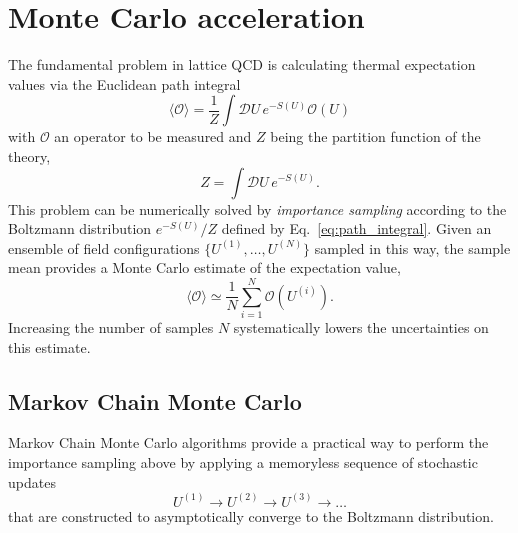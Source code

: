 \documentclass[12pt]{article}
\begin{document}
\section{Monte Carlo acceleration}\label{sec:mc-acceleration}

The fundamental problem in lattice QCD is calculating thermal expectation values via the Euclidean path integral
\begin{equation}
\label{eq:path_integral}
  \langle \mathcal{O} \rangle = \frac{1}{Z} \int \mathcal{D} U \, e^{-S(U)}  \mathcal{O}(U)
\end{equation}
with $\mathcal{O}$ an operator to be measured and $Z$ being the partition function of the theory,
\begin{equation}
\label{eq:partition_function}
  Z = \int \mathcal{D} U \, e^{-S(U)}.
\end{equation}
This problem can be numerically solved by \emph{importance sampling} according to the Boltzmann distribution $e^{-S(U)}/Z$ defined by Eq.~\eqref{eq:path_integral}.
Given an ensemble of field configurations $\{ U^{(1)}, \dots, U^{(N)} \}$ sampled in this way, the sample mean provides a Monte Carlo estimate of the expectation value,
\begin{equation}
\label{eq:mc_obs_estimator}
    \langle \mathcal{O} \rangle \simeq \frac{1}{N} \sum_{i=1}^N \mathcal{O}(U^{(i)}).
\end{equation}
Increasing the number of samples $N$ systematically lowers the uncertainties on this estimate.

\subsection{Markov Chain Monte Carlo}
Markov Chain Monte Carlo algorithms provide a practical way to perform the importance sampling above by applying a memoryless sequence of stochastic updates
\begin{equation}
    U^{(1)} \to U^{(2)} \to U^{(3)} \to \dots
\end{equation}
that are constructed to asymptotically converge to the Boltzmann distribution.
\end{document}
